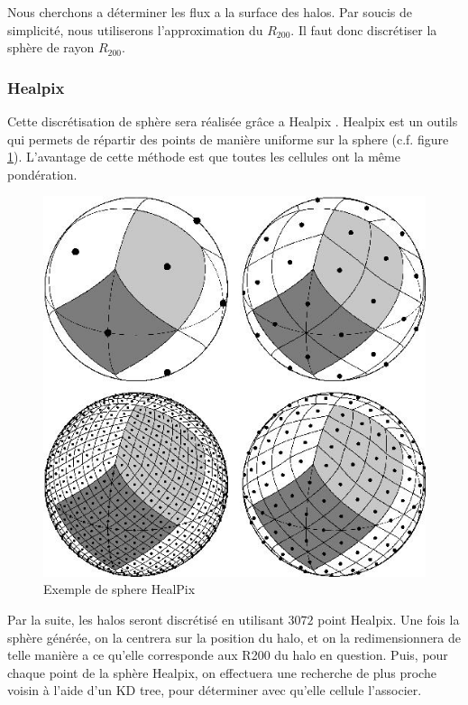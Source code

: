 Nous cherchons a déterminer les flux a la surface des halos.
Par soucis de simplicité, nous utiliserons l'approximation du $R_{200}$.
Il faut donc discrétiser la sphère de rayon $R_{200}$.


\subsubsection{Healpix}
\label{sec:healpix}

Cette discrétisation de sphère sera réalisée grâce a Healpix \citep{gorski_healpix:_2005}.
Healpix est un outils qui permets de répartir des points de manière uniforme sur la sphere (c.f. figure \ref{fig:HealPix}).
L'avantage de cette méthode est que toutes les cellules ont la même pondération.


\begin{figure}[bth]
        \includegraphics[width=.95\linewidth]{img/03/healpix.jpg} 
        \caption{Exemple de sphere HealPix}
 		\label{fig:HealPix}
\end{figure}

Par la suite, les halos seront discrétisé en utilisant $3072$ point Healpix.
Une fois la sphère générée, on la centrera sur la position du halo, et on la redimensionnera de telle manière a ce qu'elle corresponde aux R200 du halo en question.
Puis, pour chaque point de la sphère Healpix, on effectuera une recherche de plus proche voisin à l'aide d'un KD tree, pour déterminer avec qu'elle cellule l'associer.


